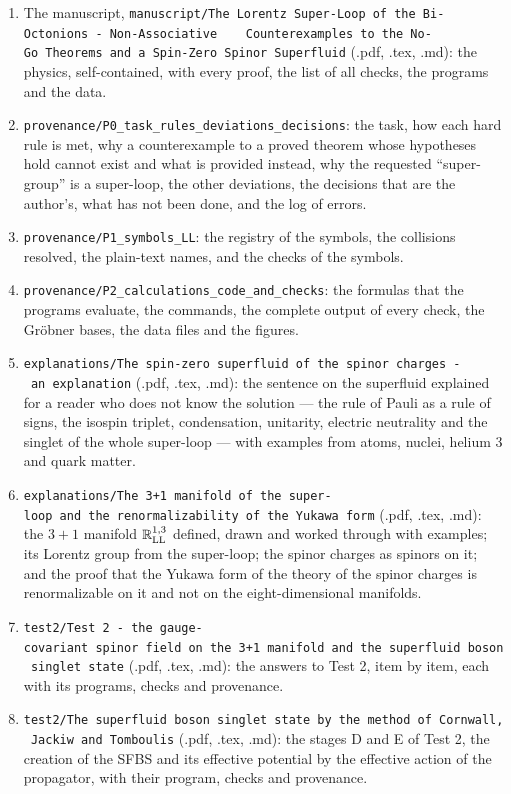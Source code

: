 \documentclass[
  10pt,
]{article}
\providecommand{\tightlist}{%
  \setlength{\itemsep}{0pt}\setlength{\parskip}{0pt}}
\begin{document}
\begin{enumerate}
\def\labelenumi{\arabic{enumi}.}
\tightlist
\item
  The manuscript,
  \texttt{manuscript/The\ Lorentz\ Super-Loop\ of\ the\ Bi-Octonions\ -\ Non-Associative\ \ \ \ Counterexamples\ to\ the\ No-Go\ Theorems\ and\ a\ Spin-Zero\ Spinor\ Superfluid}
  (.pdf, .tex, .md): the physics, self-contained, with every proof, the
  list of all checks, the programs and the data.
\item
  \texttt{provenance/P0\_task\_rules\_deviations\_decisions}: the task,
  how each hard rule is met, why a counterexample to a proved theorem
  whose hypotheses hold cannot exist and what is provided instead, why
  the requested ``super-group'' is a super-loop, the other deviations,
  the decisions that are the author's, what has not been done, and the
  log of errors.
\item
  \texttt{provenance/P1\_symbols\_LL}: the registry of the symbols, the
  collisions resolved, the plain-text names, and the checks of the
  symbols.
\item
  \texttt{provenance/P2\_calculations\_code\_and\_checks}: the formulas
  that the programs evaluate, the commands, the complete output of every
  check, the Gröbner bases, the data files and the figures.
\item
  \texttt{explanations/The\ spin-zero\ superfluid\ of\ the\ spinor\ charges\ -\ an\ explanation}
  (.pdf, .tex, .md): the sentence on the superfluid explained for a
  reader who does not know the solution --- the rule of Pauli as a rule
  of signs, the isospin triplet, condensation, unitarity, electric
  neutrality and the singlet of the whole super-loop --- with examples
  from atoms, nuclei, helium 3 and quark matter.
\item
  \texttt{explanations/The\ 3+1\ manifold\ of\ the\ super-loop\ and\ the\ renormalizability\ of\ the\ Yukawa\ form}
  (.pdf, .tex, .md): the \(3+1\) manifold \(\mathbb R^{1,3}_{\rm LL}\)
  defined, drawn and worked through with examples; its Lorentz group
  from the super-loop; the spinor charges as spinors on it; and the
  proof that the Yukawa form of the theory of the spinor charges is
  renormalizable on it and not on the eight-dimensional manifolds.
\item
  \texttt{test2/Test\ 2\ -\ the\ gauge-covariant\ spinor\ field\ on\ the\ 3+1\ manifold\ and\ the\ superfluid\ boson\ singlet\ state}
  (.pdf, .tex, .md): the answers to Test 2, item by item, each with its
  programs, checks and provenance.
\item
  \texttt{test2/The\ superfluid\ boson\ singlet\ state\ by\ the\ method\ of\ Cornwall,\ Jackiw\ and\ Tomboulis}
  (.pdf, .tex, .md): the stages D and E of Test 2, the creation of the
  SFBS and its effective potential by the effective action of the
  propagator, with their program, checks and provenance.
\end{enumerate}
\end{document}
